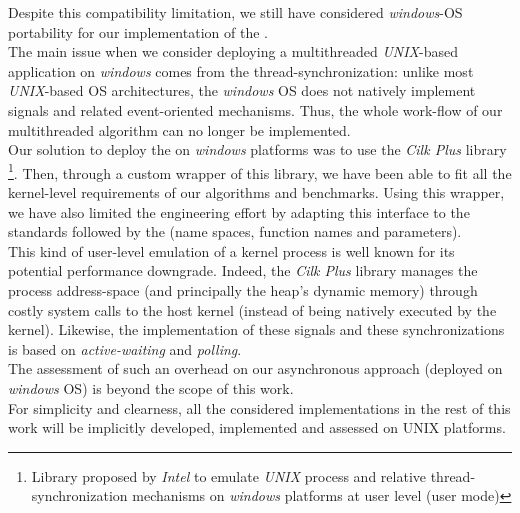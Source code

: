 		Despite this compatibility limitation, we still have considered \emph{windows}-OS portability for our implementation of the \toolTargetSoftware.\\
		The main issue when we consider deploying a multithreaded \emph{UNIX}-based application on \emph{windows} comes from the thread-synchronization:   unlike most \emph{UNIX}-based OS architectures, the \emph{windows} OS does not natively implement signals and related event-oriented mechanisms.   Thus, the whole work-flow of our multithreaded algorithm can no longer be implemented.\\
		Our solution to deploy the \toolTargetSoftware\space on \emph{windows} platforms was to use the \emph{Cilk Plus}\cite{robison2012cilk} library \footnote{Library proposed by \emph{Intel} to emulate \emph{UNIX} process and relative thread-synchronization mechanisms on \emph{windows} platforms at user level (user mode)}.   Then, through a custom wrapper of this library, we have been able to fit all the kernel-level requirements of our algorithms and benchmarks.   Using this wrapper, we have also limited the engineering effort by adapting this interface to the standards followed by the \toolTargetSoftware\space (name spaces, function names and parameters).\\
		This kind of user-level emulation of a kernel process is well known for its potential performance downgrade\cite{tousimojarad2014comparison}.   Indeed, the \emph{Cilk Plus} library manages the process address-space (and principally the heap's dynamic memory) through costly system calls to the host kernel (instead of being natively executed by the kernel).   Likewise, the implementation of these signals and these synchronizations is based on \emph{active-waiting} and \emph{polling}.\\
		The assessment of such an overhead on our asynchronous approach (deployed on \emph{windows} OS) is beyond the scope of this work.\\

		For simplicity and clearness, all the considered implementations in the rest of this work will be implicitly developed, implemented and assessed on UNIX platforms.



